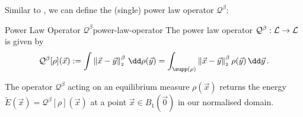 Similar to , we can define the (single) power law operator $\mathcal{Q}^\beta$:

\begin{definition}{Power Law Operator $\mathcal{Q}^\beta$}{power-law-operator}
  The power law operator $\mathcal{Q}^\beta: \mathcal{L} \to \mathcal{L}$ is given by
  $$\mathcal{Q}^\beta[\rho](\vec{x}) := \int \norm{\vec{x}-\vec{y}}^\beta \,\dd\rho(\vec{y}) = \int_{\supp(\rho)} \norm{\vec{x}-\vec{y}}^\beta \rho(\vec{y}) \,\dd\vec{y}\,.$$
\end{definition}

The operator $\mathcal{Q}^\beta$ acting on an equilibrium measure $\rho(\vec{x})$ returns the energy $\tilde{E}(\vec{x}) = \mathcal{Q}^\beta[\rho](\vec{x})$ at a point $\vec{x} \in B_1(\vec{0})$ in our normalised domain.
